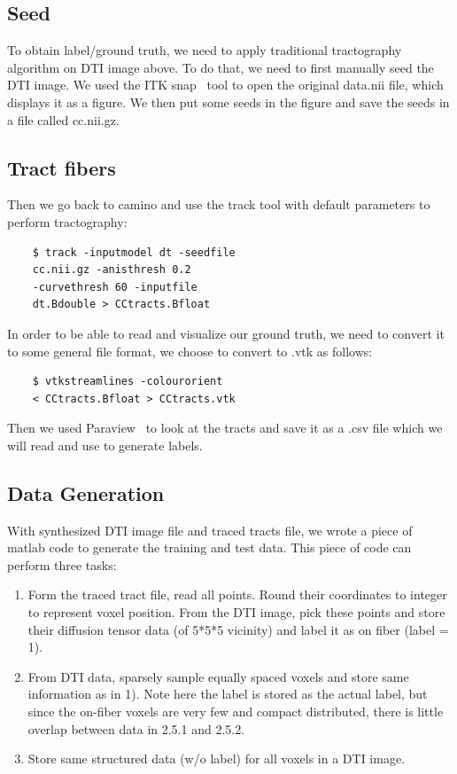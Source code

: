 \documentclass[10pt,twocolumn,letterpaper]{article}
\begin{document}
	
	\subsection{Seed}
	To obtain label/ground truth, we need to apply traditional tractography algorithm on DTI image above. To do that, we need to first manually seed the DTI image. We used the ITK snap~\cite{yushkevich2006user} tool to open the original data.nii file, which displays it as a figure. We then put some seeds in the figure and save the seeds in a file called cc.nii.gz.
	
	\subsection{Tract fibers}
	Then we go back to camino and use the track tool with default parameters to perform tractography:
	
	\begin{verbatim}
	$ track -inputmodel dt -seedfile 
	cc.nii.gz -anisthresh 0.2 
	-curvethresh 60 -inputfile 
	dt.Bdouble > CCtracts.Bfloat
	\end{verbatim}
	
	In order to be able to read and visualize our ground truth, we need to convert it to some general file format, we choose to convert to .vtk as follows:
	
	\begin{verbatim}
	$ vtkstreamlines -colourorient 
	< CCtracts.Bfloat > CCtracts.vtk
	\end{verbatim}
	
	
	Then we used Paraview~\cite{ayachit2015paraview} to look at the tracts and save it as a .csv file which we will read and use to generate labels.
	
	\subsection{Data Generation}
	With synthesized DTI image file and traced tracts file, we wrote a piece of matlab code to generate the training and test data. This piece of code can perform three tasks:
	
	\begin{enumerate}
		\item
		Form the traced tract file, read all points. Round their coordinates to integer to represent voxel position. From the DTI image, pick these points and store their diffusion tensor data (of 5*5*5 vicinity) and label it as on fiber (label = 1).
		
		\item
		From DTI data, sparsely sample equally spaced voxels and store same information as in 1). Note here the label is stored as the actual label, but since the on-fiber voxels are very few and compact distributed, there is little overlap between data in 2.5.1 and 2.5.2.
		
		\item
		Store same structured data (w/o label) for all voxels in a DTI image. 
	\end{enumerate}
	
\end{document}
